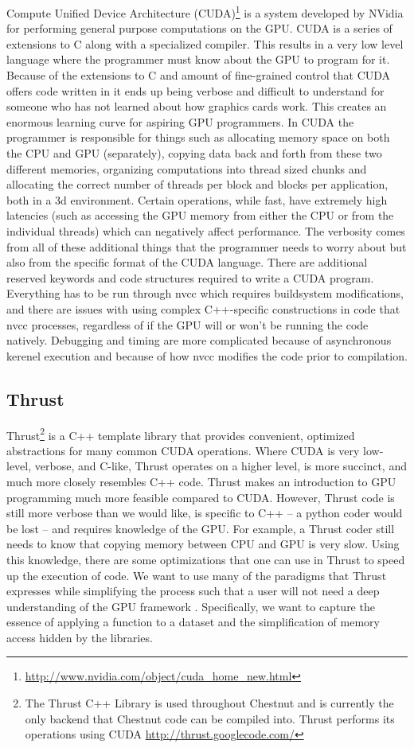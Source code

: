 \documentclass[twocolumn]{article}
\renewcommand{\|}{\origbar} %
\begin{document}
Compute Unified Device Architecture (CUDA)\footnote{\url{http://www.nvidia.com/object/cuda_home_new.html}} is a system developed by NVidia for performing general purpose computations on the GPU. CUDA is a series of extensions to C along with a specialized compiler. This results in a very low level language where the programmer must know about the GPU to program for it. Because of the extensions to C and amount of fine-grained control that CUDA offers code written in it ends up being verbose and difficult to understand for someone who has not learned about how graphics cards work. This creates an enormous learning curve for aspiring GPU programmers. In CUDA the programmer is responsible for things such as allocating memory space on both the CPU and GPU (separately), copying data back and forth from these two different memories, organizing computations into thread sized chunks and allocating the correct number of threads per block and blocks per application, both in a 3d environment. Certain operations, while fast, have extremely high latencies (such as accessing the GPU memory from either the CPU or from the individual threads) which can negatively affect performance. The verbosity comes from all of these additional things that the programmer needs to worry about but also from the specific format of the CUDA language. There are additional reserved keywords and code structures required to write a CUDA program. Everything has to be run through nvcc which requires buildsystem modifications, and there are issues with using complex C++-specific constructions in code that nvcc processes, regardless of if the GPU will or won't be running the code natively. Debugging and timing are more complicated because of asynchronous kerenel execution and because of how nvcc modifies the code prior to compilation.

\subsection{Thrust}

Thrust\footnote{The Thrust C++ Library is used throughout Chestnut and is currently the only backend that Chestnut code can be compiled into. Thrust performs its operations using CUDA \url{http://thrust.googlecode.com/}} is a C++ template library that provides convenient, optimized abstractions for many common CUDA operations. Where CUDA is very low-level, verbose, and C-like, Thrust operates on a higher level, is more succinct, and much more closely resembles C++ code. Thrust makes an introduction to GPU programming much more feasible compared to CUDA. However, Thrust code is still more verbose than we would like, is specific to C++ -- a python coder would be lost -- and requires knowledge of the GPU. For example, a Thrust coder still needs to know that copying memory between CPU and GPU is very slow. Using this knowledge, there are some optimizations that one can use in Thrust to speed up the execution of code. We want to use many of the paradigms that Thrust expresses while simplifying the process such that a user will not need a deep understanding of the GPU framework \cite{hoberock}. Specifically, we want to capture the essence of applying a function to a dataset and the simplification of memory access hidden by the libraries.
\end{document}
